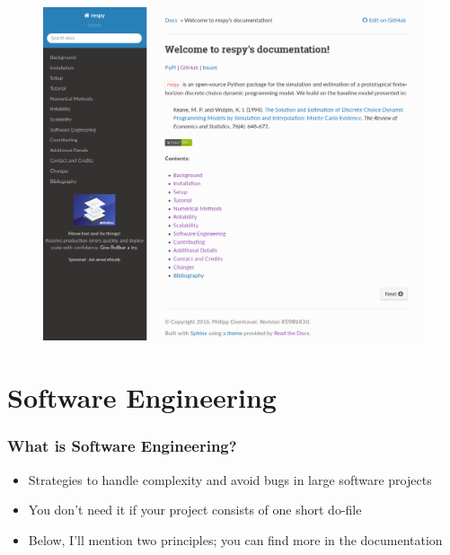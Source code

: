 \documentclass[11pt]{beamer}
\begin{document}
\begin{frame}
    \begin{figure}
      \includegraphics[height=\textheight]{../graphs/respy_rtd.png}
    \end{figure}
\end{frame}




\section{Software Engineering}


\begin{frame}[c]\frametitle{What is Software Engineering?}
    \begin{itemize}
        \item Strategies to handle complexity and avoid bugs in large software projects
        \item You don't need it if your project consists of one short do-file %

        \item Below, I'll mention two principles; you can find more in the documentation
    \end{itemize}
\end{frame}
\end{document}
